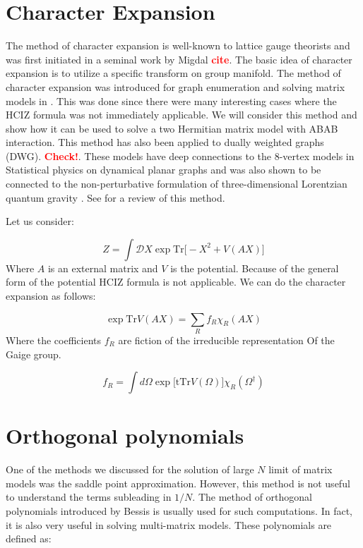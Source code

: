 \documentclass[11pt]{article}
\newcommand{\TODO}[1]{\textcolor{red}{{\bf #1}}}
\begin{document}
\section{Character Expansion} 
The method of character expansion is well-known to lattice gauge 
theorists and was first initiated in a seminal work by Migdal \TODO{cite}. 
The basic idea of character expansion is to utilize a specific transform 
on group manifold. The method of character expansion was introduced for 
graph enumeration and solving matrix models in
\cite{DiFrancesco:1992cn, Kazakov:1995ae}. 
This was done since there were many interesting cases 
where the HCIZ formula was not immediately applicable. 
We will consider this method and show how it can be used to solve a 
two Hermitian matrix model with ABAB interaction.
This method has also been applied to dually weighted graphs (DWG). 
\TODO{Check!}. These models have deep connections to the 8-vertex models
in Statistical physics on dynamical planar graphs 
and was also shown to be connected to 
the non-perturbative formulation of three-dimensional Lorentzian quantum gravity \cite{Ambjorn:2001br}.
See \cite{Kazakov:2000aq} for a review of this method. 

Let us consider: 

\begin{equation}
Z = \int \mathcal{D}X \exp \mbox{Tr} \Big[ -X^2 + V(AX) \Big]
\end{equation}
Where $A$ is an external matrix and $V$ is the potential. Because of the general form of the potential HCIZ formula is not applicable. We can do the character expansion as follows:

\begin{equation}
\exp \mbox{Tr} V(AX) = \sum_{R} f_{R} \chi_{R}(AX) 
\end{equation}
Where the coefficients $f_{R}$ are fiction of the irreducible representation 
Of the Gaige group. 

\begin{equation}
f_{R} = \int d\Omega \exp \Big[ \mbox{tTr} V(\Omega)\Big] \chi_{R}(\Omega^\dagger) 
\end{equation}





\section{Orthogonal polynomials}
One of the methods we discussed for the solution of 
large $N$ limit of matrix models was the saddle point approximation. 
However, this method is not useful 
to understand the terms subleading in $1/N$. The method 
of orthogonal polynomials introduced by Bessis \cite{Bessis:1979is} 
is usually used for such computations. In fact, it is also very useful in 
solving multi-matrix models. These polynomials are defined as:
\end{document}

